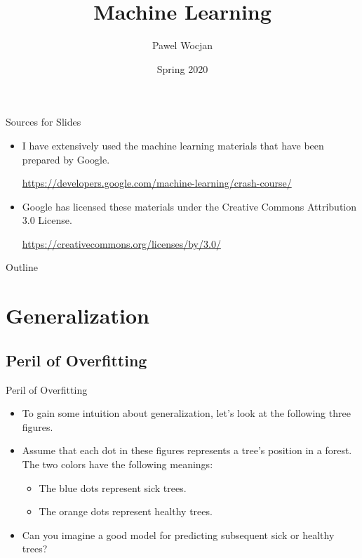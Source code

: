 \documentclass{beamer}
\title[ML]{Machine Learning}
\author{Pawel Wocjan}
\institute{University of Central Florida}
\date{Spring 2020}
\begin{document}
\begin{frame}
  \titlepage
\end{frame}

\begin{frame}{Sources for Slides}

\begin{itemize}
\item I have extensively used the machine learning materials that have been prepared by Google. 

\medskip
\footnotesize{ 
\url{https://developers.google.com/machine-learning/crash-course/}
}

\item Google has licensed these materials under the Creative Commons Attribution 3.0 License.

\medskip
\footnotesize{ 
\url{https://creativecommons.org/licenses/by/3.0/}
}
\end{itemize}
\end{frame}

\begin{frame}{Outline}
  \tableofcontents
\end{frame}

\section{Generalization}

\subsection{Peril of Overfitting}


\begin{frame}{Peril of Overfitting}
\begin{itemize}
    
\item To gain some intuition about generalization, let's look at the following three figures. 

\medskip
\item Assume that each dot in these figures represents a tree's position in a forest. The two colors have the following meanings:
    
\medskip
\begin{itemize}
\item The blue dots represent sick trees.

\medskip
\item The orange dots represent healthy trees.
    
\end{itemize}

\medskip    
\item Can you imagine a good model for predicting subsequent sick or healthy trees? 

\end{itemize}
\end{frame}
\end{document}
